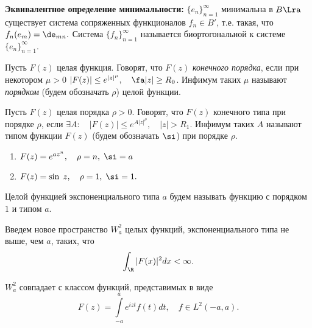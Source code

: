 \documentclass[a4paper]{article}
\begin{document}
\noindent\textbf{Эквивалентное определение минимальности:}
$\{e_n\}_{n=1}^{\infty}$ минимальна в $B\Lra$
существует система сопряженных функционалов $f_n\in B'$, т.е.
такая, что $f_n(e_m)=\de_{mn}.$ Система
$\{f_n\}_{n=1}^{\infty}$ называется биортогональной к системе
$\{e_n\}_{n=1}^{\infty}.$

\begin{df}
  Пусть $F(z)$ целая функция. Говорят, что
  $F(z)$ \emph{конечного порядка}, если при некотором $\mu>0$
  $|F(z)|\le e^{|z|^{\mu}},\quad\fa |z|\ge R_0$. Инфимум таких
  $\mu$ называют \emph{порядком} (будем обозначать $\rho$) целой
  функции.
\end{df}

\begin{df}
  Пусть $F(z)$ целая порядка $\rho>0.$
  Говорят, что $F(z)$ конечного типа при порядке $\rho$, если
  $\exi A:\quad|F(z)|\le e^{A|z|^{\rho}},\quad|z|>R_1.$ Инфимум
  таких $A$ называют типом функции $F(z)$ (будем обозначать
  $\si$) при порядке $\rho.$
\end{df}

\begin{ex}
  \begin{enumerate}
  \item
    $F(z)=e^{az^n},\quad\rho=n,\;\si=a$
  \item
    $F(z)=\sin\;z,\quad\rho=1,\;\si=1.$
  \end{enumerate}
\end{ex}

\begin{df}
  Целой функцией экспоненциального типа $a$
  будем называть функцию с порядком $1$ и типом $a$.
\end{df}

Введем новое пространство $W^2_a$ целых функций, экспоненциального
типа не выше, чем $a$, таких, что
$$\int_{\R }|F(x)|^2dx<\infty.$$

\begin{theorem}
$W^2_a$ совпадает с классом функций, представимых в виде
$$F(z)=\int\limits_{-a}^ae^{izt}f(t)dt,\quad f\in L^2(-a,a).$$
\end{theorem}
\end{document}
